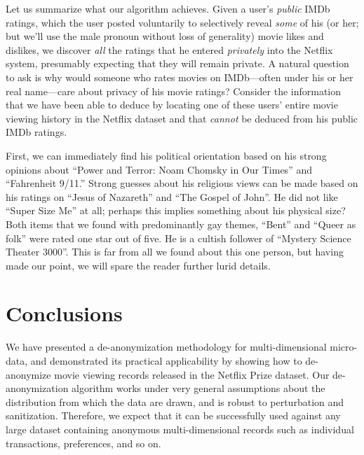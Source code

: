 \documentclass[11pt]{article}
\begin{document}

Let us summarize what our algorithm achieves.  Given a user's
\emph{public} IMDb ratings, which the user posted voluntarily to
selectively reveal \emph{some} of his (or her; but we'll use the male
pronoun without loss of generality) movie likes and dislikes, we discover
\emph{all} the ratings that he entered \emph{privately} into the Netflix
system, presumably expecting that they will remain private.  A natural
question to ask is why would someone who rates movies on IMDb---often
under his or her real name---care about privacy of his movie ratings?
Consider the information that we have been able to deduce by locating
one of these users' entire movie viewing history in the Netflix dataset
and that \emph{cannot} be deduced from his public IMDb ratings.

First, we can immediately find his political orientation based on his
strong opinions about ``Power and Terror: Noam Chomsky in Our Times''
and ``Fahrenheit 9/11.'' Strong guesses about his religious views can be
made based on his ratings on ``Jesus of Nazareth'' and ``The Gospel of
John''. He did not like ``Super Size Me'' at all; perhaps this implies
something about his physical size?  Both items that we found with
predominantly gay themes, ``Bent'' and ``Queer as folk'' were rated
one star out of five.  He is a cultish follower of ``Mystery Science
Theater 3000''. This is far from all we found about this one person,
but having made our point, we will spare the reader further lurid details.


\section{Conclusions}

We have presented a de-anonymization methodology for multi-dimensional
micro-data, and demonstrated its practical applicability by showing how to
de-anonymize movie viewing records released in the Netflix Prize dataset.
Our de-anonymization algorithm works under very general assumptions
about the distribution from which the data are drawn, and is robust
to perturbation and sanitization.  Therefore, we expect that it can
be successfully used against any large dataset containing anonymous
multi-dimensional records such as individual transactions, preferences,
and so on.
\end{document}
